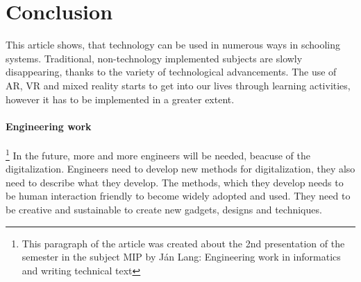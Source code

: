 \documentclass[10pt,oneside,english,a4paper]{article}
\begin{document}
\section{Conclusion}

	This article shows, that technology can be used in numerous ways in schooling systems. Traditional, non-technology implemented subjects are slowly disappearing, thanks to the variety of technological advancements. The use of AR, VR and mixed reality starts to get into our lives through learning activities, however it has to be implemented in a greater extent.

\paragraph{Engineering work}\footnote{This paragraph of the article was created about the 2nd presentation of the semester in the subject MIP by Ján Lang: Engineering work in informatics and writing technical text} In the future, more and more engineers will be needed, beacuse of the digitalization. Engineers need to develop new methods for digitalization, they also need to describe what they develop. The methods, which they develop needs to be human interaction friendly to become widely adopted and used. They need to be creative and sustainable to create new gadgets, designs and techniques.





\end{document}
